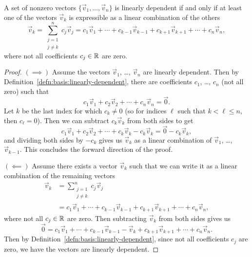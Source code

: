 \begin{theorem}
A set of nonzero vectors $\{\vec{v}_{1},\dots,\vec{v}_{n}\}$ is linearly
dependent if and only if at least one of the vectors $\vec{v}_{k}$ is
expressible as a linear combination of the others
\begin{equation}
\vec{v}_{k} = \sum^{n}_{\substack{j=1\\j\neq k}}c_{j}\vec{v}_{j} =c_{1}\vec{v}_{1} + \cdots + c_{k-1}\vec{v}_{k-1} + c_{k+1}\vec{v}_{k+1} +
  \cdots + c_{n}\vec{v}_{n},
\end{equation}
where not all coefficients $c_{j}\in\mathbb{R}$ are zero.
\end{theorem}

\begin{proof}
  $(\implies)$ Assume the vectors $\vec{v}_{1}$, \dots, $\vec{v}_{n}$
  are linearly dependent. Then by Definition~\ref{defn:basis:linearly-dependent},
  there are coefficients $c_{1}$, \dots, $c_{n}$ (not all zero) such that
\begin{equation}
c_{1}\vec{v}_{1} + c_{2}\vec{v}_{2}+\cdots+c_{n}\vec{v}_{n}=\vec{0}.
\end{equation}
Let $k$ be the last index for which $c_{k}\neq0$ (so for indices $\ell$
such that  $k<\ell\leq n$, then $c_{\ell}=0$). Then we can subtract
$c_{k}\vec{v}_{k}$ from both sides to get
\begin{equation}
c_{1}\vec{v}_{1} + c_{2}\vec{v}_{2}+\cdots+c_{k}\vec{v}_{k}-c_{k}\vec{v}_{k}=\vec{0}-c_{k}\vec{v}_{k},
\end{equation}
and dividing both sides by $-c_{k}$ gives us $\vec{v}_{k}$ as a linear
combination of $\vec{v}_{1}$, \dots, $\vec{v}_{k-1}$. This concludes the
forward direction of the proof.

  $(\impliedby)$ Assume there exists a vector $\vec{v}_{k}$ such that we
  can write it as a linear combination of the remaining vectors
\begin{equation}
\begin{split}
  \vec{v}_{k} &= \sum^{n}_{\substack{j=1\\j\neq k}}c_{j}\vec{v}_{j}\\
  &=c_{1}\vec{v}_{1} + \cdots + c_{k-1}\vec{v}_{k-1} + c_{k+1}\vec{v}_{k+1} +
  \cdots + c_{n}\vec{v}_{n},
\end{split}
\end{equation}
where not all $c_{j}\in\mathbb{R}$ are zero. Then subtracting $\vec{v}_{k}$
from both sides gives us
\begin{equation}
\vec{0} = c_{1}\vec{v}_{1} + \cdots + c_{k-1}\vec{v}_{k-1} - \vec{v}_{k} + c_{k+1}\vec{v}_{k+1} +
  \cdots + c_{n}\vec{v}_{n}.
\end{equation}
Then by Definition~\ref{defn:basis:linearly-dependent}, since not all
coefficients $c_{j}$ are zero, we have the vectors are linearly dependent.
\end{proof}

